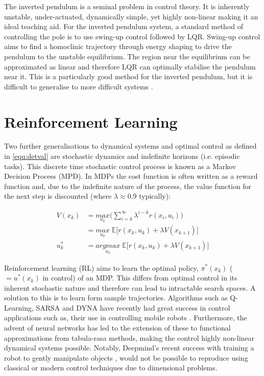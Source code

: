 \documentclass[../main.tex]{subfiles}
\begin{document}
The inverted pendulum is a seminal problem in control theory. It is inherently unstable, under-actuated, dynamically simple, yet highly non-linear making it an ideal teaching aid. For the inverted pendulum system, a standard method of controlling the pole is to use swing-up control followed by LQR. Swing-up control aims to find a homoclinic trajectory through energy shaping to drive the pendulum to the unstable equilibrium. The region near the equilibrium can be approximated as linear and therefore LQR can optimally stabilise the pendulum near it. This is a particularly good method for the inverted pendulum, but it is difficult to generalise to more difficult systems \cite{invpen}.

\section{Reinforcement Learning}
Two further generalisations to dynamical systems and optimal control as defined in \cref{equ:detval} are stochastic dynamics and indefinite horizons (i.e. episodic tasks). This discrete time stochastic control process is known as a Markov Decision Process (MPD). In MDPs the cost function is often written as a reward function and, due to the indefinite nature of the process, the value function for the next step is discounted (where $\lambda \approx 0.9$ typically):

\begin{align}
    \label{equ:mdpval} 
    V(x_k) & = \underset{u_k}{max} \bigg( \sum_{i=k}^{\infty} \lambda^{i-k} r(x_i, u_i) \bigg) \\ 
    & = \underset{u_k}{max} \; \mathbb{E} \Big[ r(x_k, u_k) + \lambda V(x_{k+1}) \Big] \\
    u^{*}_k & = \underset{u_k}{argmax}\; \mathbb{E} \Big[ r(x_k, u_k) + \lambda V(x_{k+1}) \Big]
\end{align}

Reinforcement learning (RL) aims to learn the optimal policy, $\pi^{*}(x_k)$ ($=u^{*}(x_k)$ in control) of an MDP. This differs from optimal control in its inherent stochastic nature and therefore can lead to intractable search spaces. A solution to this is to learn form sample trajectories. Algorithms such as Q-Learning, SARSA and DYNA have recently had great success in control applications such as, their use in controlling mobile robots \cite{Qlearning, RLoverview}. Furthermore, the advent of neural networks has led to the extension of these to functional approximations from tabula-rasa methods, making the control highly non-linear dynamical systems possible. Notably, Deepmind's recent success with training a robot to gently manipulate objects \cite{Robothand}, would not be possible to reproduce using classical or modern control techniques due to dimensional problems.
\end{document}
